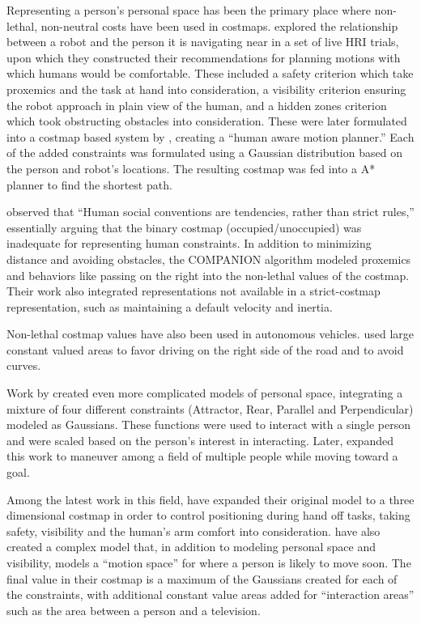 Representing a person's personal space has been the primary place where non-lethal, non-neutral costs have been used in costmaps. \citet{dautenhahn:serveseated} %
explored the relationship between a robot and the person it is navigating near in a set of live HRI trials, upon which they constructed their recommendations for planning motions with which humans would be comfortable. These included a safety criterion which take proxemics and the task at hand into consideration, a visibility criterion ensuring the robot approach in plain view of the human, and a hidden zones criterion which took obstructing obstacles into consideration. These were later formulated into a costmap based system by \citet{sisbot2007}, creating a ``human aware motion planner.'' Each of the added constraints was formulated using a Gaussian distribution based on the person and robot's locations. The resulting costmap was fed into a A* planner to find the shortest path. 

\citet{kirby:companion} observed that ``Human social conventions are tendencies, rather than strict rules,'' essentially arguing that the binary costmap (occupied/unoccupied) was inadequate for representing human constraints. In addition to minimizing distance and avoiding obstacles, the COMPANION algorithm modeled proxemics and behaviors like passing on the right into the non-lethal values of the costmap. Their work also integrated representations not available in a strict-costmap representation, such as maintaining a default velocity and inertia. 

Non-lethal costmap values have also been used in autonomous vehicles. \citet{likhachev:costmaps} used large constant valued areas to favor driving on the right side of the road and to avoid curves. 

Work by \citet{svenstrup2009} created even more complicated models of personal space, integrating a mixture of four different constraints (Attractor, Rear, Parallel and Perpendicular) modeled as Gaussians. These functions were used to interact with a single person and were scaled based on the person's interest in interacting. Later, \citet{svenstrup2010} expanded this work to maneuver among a field of multiple people while moving toward a goal. 

Among the latest work in this field, \citet{sisbot2011} have expanded their original model to a three dimensional costmap in order to control positioning during hand off tasks, taking safety, visibility and the human's arm comfort into consideration. \citet{fraichard:anthronav} have also created a complex model that, in addition to modeling personal space and visibility, models a ``motion space'' for where a person is likely to move soon. The final value in their costmap is a maximum of the Gaussians created for each of the constraints, with additional constant value areas added for ``interaction areas'' such as the area between a person and a television. 

